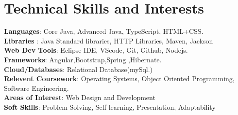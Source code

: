 \documentclass[a4paper,11pt]{article}
\makeatletter
\newcommand{\resumePOR}[3]{
\vspace{0.5mm}\item
    \begin{tabular*}{0.97\textwidth}[t]{l@{\extracolsep{\fill}}r}
        \textbf{#1}\hspace{0.3mm}#2 & \textit{\small{#3}} 
    \end{tabular*}
    \vspace{-2mm}
}
\newcommand{\resumeSubHeadingListStart}{\begin{itemize}[leftmargin=*,labelsep=0mm]}
\newcommand{\resumeItemListStart}{\begin{justify}\begin{itemize}[leftmargin=3ex, rightmargin=2ex, noitemsep,labelsep=1.2mm,itemsep=0mm]\small}
\newcommand{\resumeSubHeadingListEnd}{\end{itemize}\vspace{2mm}}
\newcommand{\resumeItemListEnd}{\end{itemize}\end{justify}\vspace{-2mm}}
\makeatother
\begin{document}
\section{\textbf{Technical Skills and Interests}}
 \begin{itemize}[leftmargin=0.05in, label={}]
    \small{\item{
     \textbf{Languages}{: Core Java, Advanced Java, TypeScript, HTML+CSS. } \\
     \textbf{Libraries }{: Java Standard libraries, HTTP Libraries, Maven, Jackson }\\ 
     \textbf{Web Dev Tools}{: Eclipse IDE, VScode, Git, Github, Nodejs. } \\ 
     \textbf{Frameworks}{: Angular,Bootstrap,Spring ,Hibernate. } \\
     \textbf{Cloud/Databases}{: Relational Database(mySql.) } \\  
     
     \textbf{Relevent Coursework}{: Operating Systems, Object Oriented Programming, Software Engineering. } \\ 
     \textbf{Areas of Interest}{: Web Design and Development } \\
     \textbf{Soft Skills}{: Problem Solving, Self-learning, Presentation, Adaptability} \\
    }}
 \end{itemize}
 \vspace{-2mm}




\end{document}
